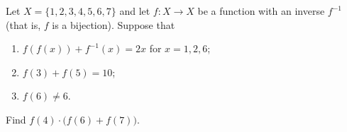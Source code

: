 Let $X=\{1,2,3,4,5,6,7\}$ and let $f:X\to X$ be a function with an inverse $f^{-1}$ (that is, $f$ is a bijection). Suppose that
\begin{enumerate}
\item[I.] $f(f(x))+f^{-1}(x)=2x$ for $x=1,2,6$;
\item[II.] $f(3)+f(5)=10$;
\item[III.] $f(6)\ne6$.
\end{enumerate}
Find $f(4)\cdot\bigl(f(6)+f(7)\bigr)$.
